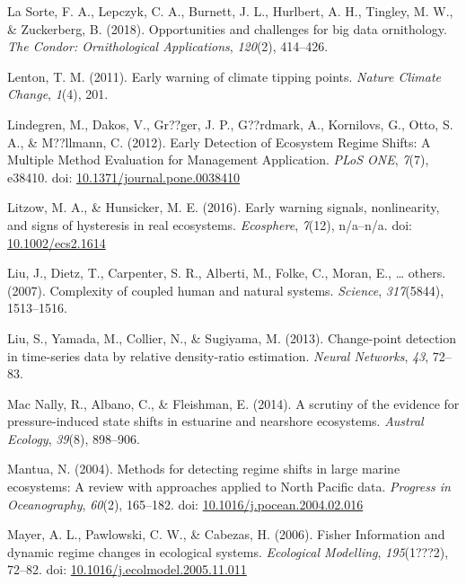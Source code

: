 \documentclass[12pt,twoside,openany]{reedthesis}
\begin{document}
\leavevmode\hypertarget{ref-lasorte2018opportunities}{}%
La Sorte, F. A., Lepczyk, C. A., Burnett, J. L., Hurlbert, A. H., Tingley, M. W., \& Zuckerberg, B. (2018). Opportunities and challenges for big data ornithology. \emph{The Condor: Ornithological Applications}, \emph{120}(2), 414--426.

\leavevmode\hypertarget{ref-lenton2011early}{}%
Lenton, T. M. (2011). Early warning of climate tipping points. \emph{Nature Climate Change}, \emph{1}(4), 201.

\leavevmode\hypertarget{ref-lindegren_early_2012}{}%
Lindegren, M., Dakos, V., Gr??ger, J. P., G??rdmark, A., Kornilovs, G., Otto, S. A., \& M??llmann, C. (2012). Early Detection of Ecosystem Regime Shifts: A Multiple Method Evaluation for Management Application. \emph{PLoS ONE}, \emph{7}(7), e38410. doi: \href{https://doi.org/10.1371/journal.pone.0038410}{10.1371/journal.pone.0038410}

\leavevmode\hypertarget{ref-litzow_early_2016}{}%
Litzow, M. A., \& Hunsicker, M. E. (2016). Early warning signals, nonlinearity, and signs of hysteresis in real ecosystems. \emph{Ecosphere}, \emph{7}(12), n/a--n/a. doi: \href{https://doi.org/10.1002/ecs2.1614}{10.1002/ecs2.1614}

\leavevmode\hypertarget{ref-liu_complexity_2007}{}%
Liu, J., Dietz, T., Carpenter, S. R., Alberti, M., Folke, C., Moran, E., \ldots{} others. (2007). Complexity of coupled human and natural systems. \emph{Science}, \emph{317}(5844), 1513--1516.

\leavevmode\hypertarget{ref-liu2013change}{}%
Liu, S., Yamada, M., Collier, N., \& Sugiyama, M. (2013). Change-point detection in time-series data by relative density-ratio estimation. \emph{Neural Networks}, \emph{43}, 72--83.

\leavevmode\hypertarget{ref-mac2014scrutiny}{}%
Mac Nally, R., Albano, C., \& Fleishman, E. (2014). A scrutiny of the evidence for pressure-induced state shifts in estuarine and nearshore ecosystems. \emph{Austral Ecology}, \emph{39}(8), 898--906.

\leavevmode\hypertarget{ref-mantua_methods_2004}{}%
Mantua, N. (2004). Methods for detecting regime shifts in large marine ecosystems: A review with approaches applied to North Pacific data. \emph{Progress in Oceanography}, \emph{60}(2), 165--182. doi: \href{https://doi.org/10.1016/j.pocean.2004.02.016}{10.1016/j.pocean.2004.02.016}

\leavevmode\hypertarget{ref-mayer_fisher_2006}{}%
Mayer, A. L., Pawlowski, C. W., \& Cabezas, H. (2006). Fisher Information and dynamic regime changes in ecological systems. \emph{Ecological Modelling}, \emph{195}(1???2), 72--82. doi: \href{https://doi.org/10.1016/j.ecolmodel.2005.11.011}{10.1016/j.ecolmodel.2005.11.011}
\end{document}
